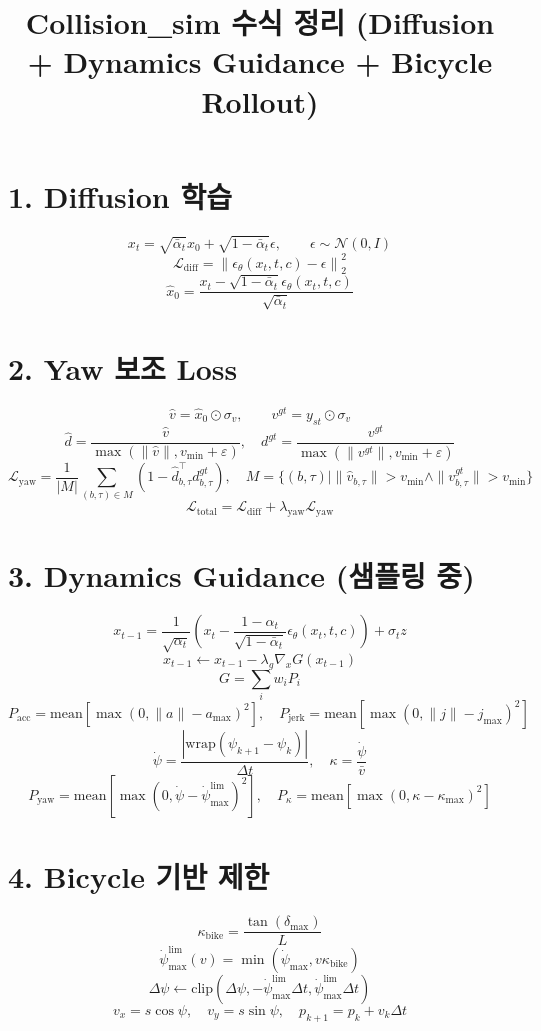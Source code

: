\documentclass[11pt,a4paper]{article}
\title{Collision\_sim 수식 정리 (Diffusion + Dynamics Guidance + Bicycle Rollout)}
\author{}
\date{}
\begin{document}
\maketitle

\section*{1. Diffusion 학습}
\[
x_t=\sqrt{\bar{\alpha}_t}x_0+\sqrt{1-\bar{\alpha}_t}\epsilon,\qquad \epsilon\sim\mathcal{N}(0,I)
\]
\[
\mathcal{L}_{\mathrm{diff}}=\left\|\epsilon_\theta(x_t,t,c)-\epsilon\right\|_2^2
\]
\[
\hat{x}_0=\frac{x_t-\sqrt{1-\bar{\alpha}_t}\epsilon_\theta(x_t,t,c)}{\sqrt{\bar{\alpha}_t}}
\]

\section*{2. Yaw 보조 Loss}
\[
\hat{v}=\hat{x}_0\odot\sigma_v,\qquad v^{gt}=y_{st}\odot\sigma_v
\]
\[
\hat{d}=\frac{\hat{v}}{\max(\|\hat{v}\|,v_{\min}+\varepsilon)},\quad
d^{gt}=\frac{v^{gt}}{\max(\|v^{gt}\|,v_{\min}+\varepsilon)}
\]
\[
\mathcal{L}_{\mathrm{yaw}}
=\frac{1}{|M|}\sum_{(b,\tau)\in M}\left(1-\hat{d}_{b,\tau}^{\top}d_{b,\tau}^{gt}\right),
\quad
M=\{(b,\tau)\mid \|\hat{v}_{b,\tau}\|>v_{\min}\land \|v^{gt}_{b,\tau}\|>v_{\min}\}
\]
\[
\mathcal{L}_{\mathrm{total}}=\mathcal{L}_{\mathrm{diff}}+\lambda_{\mathrm{yaw}}\mathcal{L}_{\mathrm{yaw}}
\]

\section*{3. Dynamics Guidance (샘플링 중)}
\[
x_{t-1}=\frac{1}{\sqrt{\alpha_t}}\left(x_t-\frac{1-\alpha_t}{\sqrt{1-\bar{\alpha}_t}}\epsilon_\theta(x_t,t,c)\right)+\sigma_t z
\]
\[
x_{t-1}\leftarrow x_{t-1}-\lambda_g\nabla_x G(x_{t-1})
\]
\[
G=\sum_i w_i P_i
\]
\[
P_{\mathrm{acc}}=\mathrm{mean}\left[\max(0,\|a\|-a_{\max})^2\right],\quad
P_{\mathrm{jerk}}=\mathrm{mean}\left[\max(0,\|j\|-j_{\max})^2\right]
\]
\[
\dot{\psi}=\frac{|\mathrm{wrap}(\psi_{k+1}-\psi_k)|}{\Delta t},\quad
\kappa=\frac{\dot{\psi}}{\bar{v}}
\]
\[
P_{\mathrm{yaw}}=\mathrm{mean}\left[\max(0,\dot{\psi}-\dot{\psi}_{\max}^{\mathrm{lim}})^2\right],\quad
P_{\kappa}=\mathrm{mean}\left[\max(0,\kappa-\kappa_{\max})^2\right]
\]

\section*{4. Bicycle 기반 제한}
\[
\kappa_{\mathrm{bike}}=\frac{\tan(\delta_{\max})}{L}
\]
\[
\dot{\psi}_{\max}^{\mathrm{lim}}(v)=\min\left(\dot{\psi}_{\max},v\kappa_{\mathrm{bike}}\right)
\]
\[
\Delta\psi\leftarrow\mathrm{clip}\left(\Delta\psi,-\dot{\psi}_{\max}^{\mathrm{lim}}\Delta t,\dot{\psi}_{\max}^{\mathrm{lim}}\Delta t\right)
\]
\[
v_x=s\cos\psi,\quad v_y=s\sin\psi,\quad p_{k+1}=p_k+v_k\Delta t
\]
\end{document}
